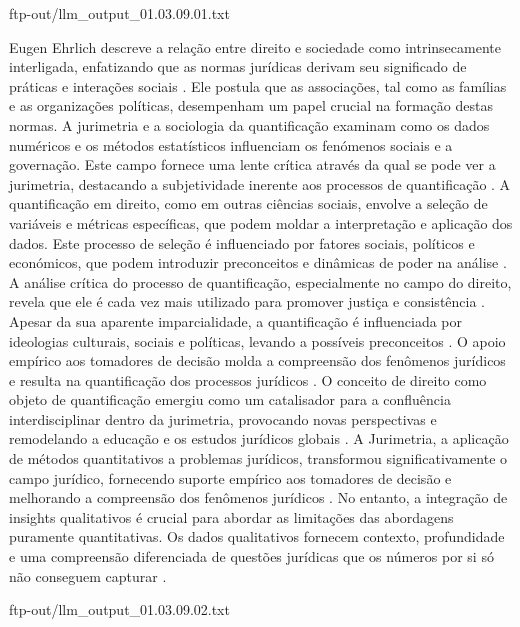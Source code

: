 ftp-out/llm_output_01.03.09.01.txt 

Eugen Ehrlich descreve a relação entre direito e sociedade como intrinsecamente interligada, enfatizando que as normas jurídicas derivam seu significado de práticas e interações sociais \cite{venturini2024}. Ele postula que as associações, tal como as famílias e as organizações políticas, desempenham um papel crucial na formação destas normas. A jurimetria e a sociologia da quantificação examinam como os dados numéricos e os métodos estatísticos influenciam os fenómenos sociais e a governação. Este campo fornece uma lente crítica através da qual se pode ver a jurimetria, destacando a subjetividade inerente aos processos de quantificação \cite{salais2016}. A quantificação em direito, como em outras ciências sociais, envolve a seleção de variáveis e métricas específicas, que podem moldar a interpretação e aplicação dos dados. Este processo de seleção é influenciado por fatores sociais, políticos e económicos, que podem introduzir preconceitos e dinâmicas de poder na análise \cite{salais2016}. A análise crítica do processo de quantificação, especialmente no campo do direito, revela que ele é cada vez mais utilizado para promover justiça e consistência \cite{10.1057/s41599-020-00557-0,de2010jurimetrics}. Apesar da sua aparente imparcialidade, a quantificação é influenciada por ideologias culturais, sociais e políticas, levando a possíveis preconceitos \cite{ccdacdfbcdaf,efbfffafaacadd}. O apoio empírico aos tomadores de decisão molda a compreensão dos fenômenos jurídicos e resulta na quantificação dos processos jurídicos \cite{ccdacdfbcdaf,efbfffafaacadd}. O conceito de direito como objeto de quantificação emergiu como um catalisador para a confluência interdisciplinar dentro da jurimetria, provocando novas perspectivas e remodelando a educação e os estudos jurídicos globais \cite{losano2006}. A Jurimetria, a aplicação de métodos quantitativos a problemas jurídicos, transformou significativamente o campo jurídico, fornecendo suporte empírico aos tomadores de decisão e melhorando a compreensão dos fenômenos jurídicos \cite{10.3390/fi9040068,10.5040/9781350220645,de2010jurimetrics}. No entanto, a integração de insights qualitativos é crucial para abordar as limitações das abordagens puramente quantitativas. Os dados qualitativos fornecem contexto, profundidade e uma compreensão diferenciada de questões jurídicas que os números por si só não conseguem capturar \cite{10.1590/dados.2022.65.3.267,10.1057/s41599-020-00557-0}. 

ftp-out/llm_output_01.03.09.02.txt 

